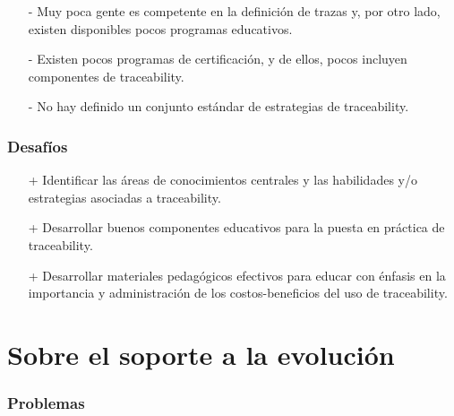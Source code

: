 \documentclass[a4paper,12pt,oneside,spanish]{book}
\begin{document}
\begin{itemize}
\item[-] Muy poca gente es competente en la definición de trazas y, por otro lado, existen disponibles pocos programas educativos.

\item[-] Existen pocos programas de certificación, y de ellos, pocos incluyen componentes de traceability.

\item[-] No hay definido un conjunto estándar de estrategias de traceability.

\end{itemize}

\subsubsection{Desafíos}

\begin{itemize}
\item[+] Identificar las áreas de conocimientos centrales y las habilidades y/o estrategias asociadas a traceability.

\item[+] Desarrollar buenos componentes educativos para la puesta en práctica de traceability.

\item[+] Desarrollar materiales pedagógicos efectivos para educar con énfasis en la importancia y administración de los costos-beneficios del uso de traceability.

\end{itemize}

\section{Sobre el soporte a la evolución}

\subsubsection{Problemas}
\end{document}
